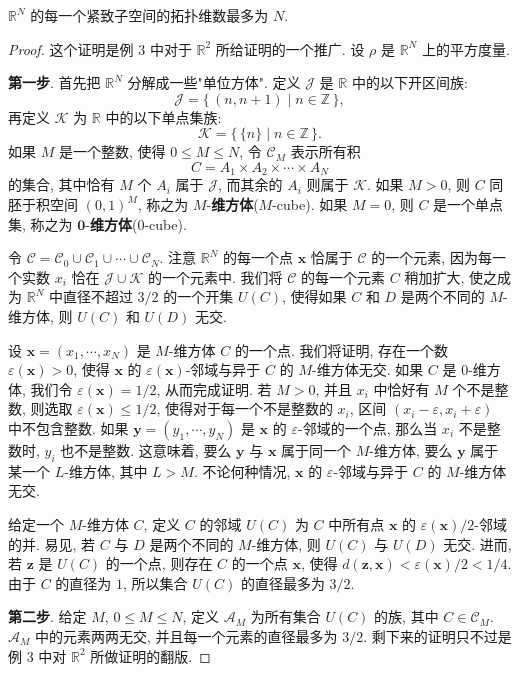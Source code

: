 \begin{theorem}
\label{theorem:ch08-sec50-50-6}
$\mathbb{R}^{N}$ 的每一个紧致子空间的拓扑维数最多为 $N$.
\end{theorem}

\begin{proof}
这个证明是例 3 中对于 $\mathbb{R}^{2}$ 所给证明的一个推广. 设 $\rho$ 是 $\mathbb{R}^{N}$ 上的平方度量.

\textbf{第一步}. 首先把 $\mathbb{R}^{N}$ 分解成一些"单位方体". 定义 $\mathcal{J}$ 是 $\mathbb{R}$ 中的以下开区间族:
\[
\mathcal{J}=\{\,(n,n+1)\mid n\in\mathbb{Z}\,\},
\]
再定义 $\mathcal{K}$ 为 $\mathbb{R}$ 中的以下单点集族:
\[
\mathcal{K}=\{\,\{n\}\mid n\in\mathbb{Z}\,\}.
\]
如果 $M$ 是一个整数, 使得 $0\leqslant M\leqslant N$, 令 $\mathcal{C}_{M}$ 表示所有积
\[
C=A_{1}\times A_{2}\times\cdots\times A_{N}
\]
的集合, 其中恰有 $M$ 个 $A_i$ 属于 $\mathcal{J}$, 而其余的 $A_i$ 则属于 $\mathcal{K}$. 如果 $M>0$, 则 $C$ 同胚于积空间 $(0,1)^M$, 称之为 $M$-\textbf{维方体}($M$-cube). 如果 $M=0$, 则 $C$ 是一个单点集, 称之为 $\boldsymbol{0}$-\textbf{维方体}($0$-cube).

令 $\mathcal{C}=\mathcal{C}_{0}\cup\mathcal{C}_{1}\cup\cdots\cup\mathcal{C}_{N}$. 注意 $\mathbb{R}^{N}$ 的每一个点 $\boldsymbol{x}$ 恰属于 $\mathcal{C}$ 的一个元素, 因为每一个实数 $x_i$ 恰在 $\mathcal{J}\cup\mathcal{K}$ 的一个元素中. 我们将 $\mathcal{C}$ 的每一个元素 $C$ 稍加扩大, 使之成为 $\mathbb{R}^{N}$ 中直径不超过 $3/2$ 的一个开集 $U(C)$, 使得如果 $C$ 和 $D$ 是两个不同的 $M$-维方体, 则 $U(C)$ 和 $U(D)$ 无交.

设 $\boldsymbol{x}=(x_1,\cdots,x_N)$ 是 $M$-维方体 $C$ 的一个点. 我们将证明, 存在一个数 $\varepsilon(\boldsymbol{x})>0$, 使得 $\boldsymbol{x}$ 的 $\varepsilon(\boldsymbol{x})$-邻域与异于 $C$ 的 $M$-维方体无交. 如果 $C$ 是 $0$-维方体, 我们令 $\varepsilon(\boldsymbol{x})=1/2$, 从而完成证明. 若 $M>0$, 并且 $x_i$ 中恰好有 $M$ 个不是整数, 则选取 $\varepsilon(\boldsymbol{x})\leqslant 1/2$, 使得对于每一个不是整数的 $x_i$, 区间 $(x_i-\varepsilon,x_i+\varepsilon)$ 中不包含整数. 如果 $\boldsymbol{y}=(y_1,\cdots,y_N)$ 是 $\boldsymbol{x}$ 的 $\varepsilon$-邻域的一个点, 那么当 $x_i$ 不是整数时, $y_i$ 也不是整数. 这意味着, 要么 $\boldsymbol{y}$ 与 $\boldsymbol{x}$ 属于同一个 $M$-维方体, 要么 $\boldsymbol{y}$ 属于某一个 $L$-维方体, 其中 $L>M$. 不论何种情况, $\boldsymbol{x}$ 的 $\varepsilon$-邻域与异于 $C$ 的 $M$-维方体无交.

给定一个 $M$-维方体 $C$, 定义 $C$ 的邻域 $U(C)$ 为 $C$ 中所有点 $\boldsymbol{x}$ 的 $\varepsilon(\boldsymbol{x})/2$-邻域的并. 易见, 若 $C$ 与 $D$ 是两个不同的 $M$-维方体, 则 $U(C)$ 与 $U(D)$ 无交. 进而, 若 $\boldsymbol{z}$ 是 $U(C)$ 的一个点, 则存在 $C$ 的一个点 $\boldsymbol{x}$, 使得 $d(\boldsymbol{z},\boldsymbol{x})<\varepsilon(\boldsymbol{x})/2<1/4$. 由于 $C$ 的直径为 $1$, 所以集合 $U(C)$ 的直径最多为 $3/2$.

\textbf{第二步}. 给定 $M$, $0\leqslant M\leqslant N$, 定义 $\mathcal{A}_{M}$ 为所有集合 $U(C)$ 的族, 其中 $C\in\mathcal{C}_{M}$. $\mathcal{A}_{M}$ 中的元素两两无交, 并且每一个元素的直径最多为 $3/2$. 剩下来的证明只不过是例 3 中对 $\mathbb{R}^{2}$ 所做证明的翻版.
\end{proof}

